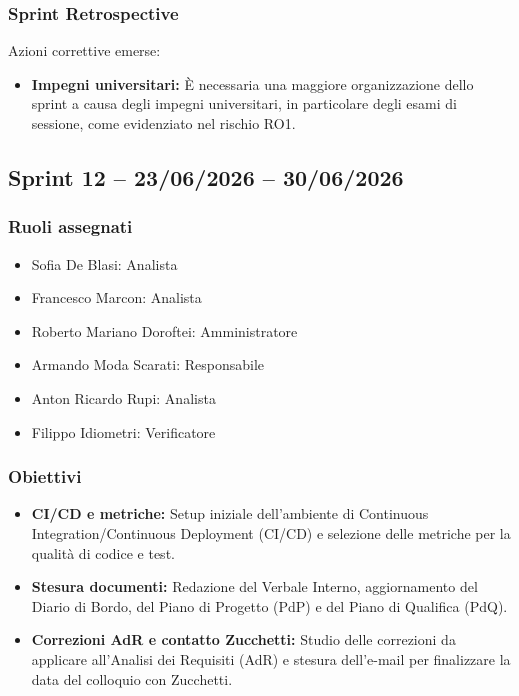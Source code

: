 \subsubsection{Sprint Retrospective}
Azioni correttive emerse:
\begin{itemize}
    \item \textbf{Impegni universitari:} È necessaria una maggiore organizzazione dello sprint a causa degli impegni universitari, in particolare degli esami di sessione, come evidenziato nel rischio RO1.
\end{itemize}


\subsection{Sprint 12 -- 23/06/2026 -- 30/06/2026}
\label{sec:sprint12}

\subsubsection{Ruoli assegnati}
\begin{itemize}
    \item Sofia De Blasi: Analista
    \item Francesco Marcon: Analista
    \item Roberto Mariano Doroftei: Amministratore
    \item Armando Moda Scarati: Responsabile
    \item Anton Ricardo Rupi: Analista
    \item Filippo Idiometri: Verificatore
\end{itemize}

\subsubsection{Obiettivi}
\begin{itemize}
    \item \textbf{CI/CD e metriche:} Setup iniziale dell'ambiente di Continuous Integration/Continuous Deployment (CI/CD) e selezione delle metriche per la qualità di codice e test.
    \item \textbf{Stesura documenti:} Redazione del Verbale Interno, aggiornamento del Diario di Bordo, del Piano di Progetto (PdP) e del Piano di Qualifica (PdQ).
    \item \textbf{Correzioni AdR e contatto Zucchetti:} Studio delle correzioni da applicare all'Analisi dei Requisiti (AdR) e stesura dell'e-mail per finalizzare la data del colloquio con Zucchetti.
\end{itemize}

